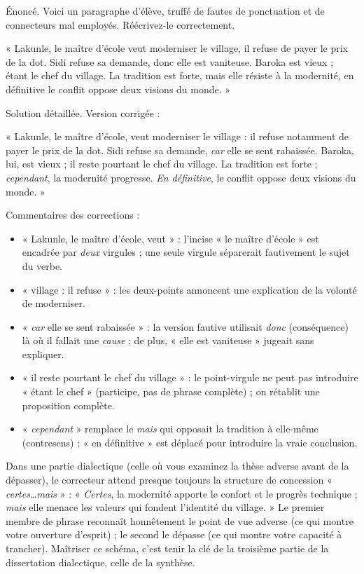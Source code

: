 \documentclass[11pt]{article}
\begin{document}
\begin{exoresolu}
Énoncé. Voici un paragraphe d'élève, truffé de fautes de ponctuation et de connecteurs mal employés. Réécrivez-le correctement.

« Lakunle, le maître d'école veut moderniser le village, il refuse de payer le prix de la dot. Sidi refuse sa demande, donc elle est vaniteuse. Baroka est vieux ; étant le chef du village. La tradition est forte, mais elle résiste à la modernité, en définitive le conflit oppose deux visions du monde. »

\tcblower
Solution détaillée. Version corrigée :

« Lakunle, le maître d'école, veut moderniser le village : il refuse notamment de payer le prix de la dot. Sidi refuse sa demande, \emph{car} elle se sent rabaissée. Baroka, lui, est vieux ; il reste pourtant le chef du village. La tradition est forte ; \emph{cependant}, la modernité progresse. \emph{En définitive}, le conflit oppose deux visions du monde. »

Commentaires des corrections :
\begin{itemize}
\item « Lakunle, le maître d'école, veut » : l'incise « le maître d'école » est encadrée par \emph{deux} virgules ; une seule virgule séparerait fautivement le sujet du verbe.
\item « village : il refuse » : les deux-points annoncent une explication de la volonté de moderniser.
\item « \emph{car} elle se sent rabaissée » : la version fautive utilisait \emph{donc} (conséquence) là où il fallait une \emph{cause} ; de plus, « elle est vaniteuse » jugeait sans expliquer.
\item « il reste pourtant le chef du village » : le point-virgule ne peut pas introduire « étant le chef » (participe, pas de phrase complète) ; on rétablit une proposition complète.
\item « \emph{cependant} » remplace le \emph{mais} qui opposait la tradition à elle-même (contresens) ; « en définitive » est déplacé pour introduire la vraie conclusion.
\end{itemize}
\end{exoresolu}

\begin{savaistu}
Dans une partie dialectique (celle où vous examinez la thèse adverse avant de la dépasser), le correcteur attend presque toujours la structure de concession « \emph{certes\ldots mais} » : « \emph{Certes}, la modernité apporte le confort et le progrès technique ; \emph{mais} elle menace les valeurs qui fondent l'identité du village. » Le premier membre de phrase reconnaît honnêtement le point de vue adverse (ce qui montre votre ouverture d'esprit) ; le second le dépasse (ce qui montre votre capacité à trancher). Maîtriser ce schéma, c'est tenir la clé de la troisième partie de la dissertation dialectique, celle de la synthèse.
\end{savaistu}
\end{document}

